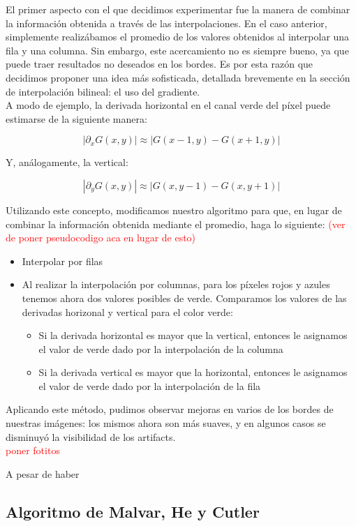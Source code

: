 \documentclass[a4paper]{article}
\begin{document}
El primer aspecto con el que decidimos experimentar fue la manera de combinar la información obtenida a través de las interpolaciones. En el caso anterior, simplemente realizábamos el promedio de los valores obtenidos al interpolar una fila y una columna. Sin embargo, este acercamiento no es siempre bueno, ya que puede traer resultados no deseados en los bordes. Es por esta razón que decidimos proponer una idea más sofisticada, detallada brevemente en la sección de interpolación bilineal: el uso del gradiente. \\

A modo de ejemplo, la derivada horizontal en el canal verde del p\'ixel puede estimarse de la siguiente manera:

\[|\partial_xG(x,y)| \approx |G(x-1,y) - G(x+1,y)|\]

Y, análogamente, la vertical:

\[|\partial_yG(x,y)| \approx |G(x,y-1) - G(x,y+1)|\]

Utilizando este concepto, modificamos nuestro algoritmo para que, en lugar de combinar la información obtenida mediante el promedio, haga lo siguiente:
\textcolor{red}{(ver de poner pseudocodigo aca en lugar de esto)}
\begin{itemize}
\item Interpolar por filas 
\item Al realizar la interpolación por columnas, para los p\'ixeles rojos y azules tenemos ahora dos valores posibles de verde. Comparamos los valores de las derivadas horizonal y vertical para el color verde:
\begin{itemize}
\item Si la derivada horizontal es mayor que la vertical, entonces le asignamos el valor de verde dado por la interpolación de la columna
\item Si la derivada vertical es mayor que la horizontal, entonces le asignamos el valor de verde dado por la interpolación de la fila
\end{itemize}
\end{itemize}

Aplicando este método, pudimos observar mejoras en varios de los bordes de nuestras imágenes: los mismos ahora son más suaves, y en algunos casos se disminuyó la visibilidad de los artifacts.\\

\textcolor{red}{poner fotitos}

A pesar de haber 


\newpage
\subsection{Algoritmo de Malvar, He y Cutler}
\end{document}
